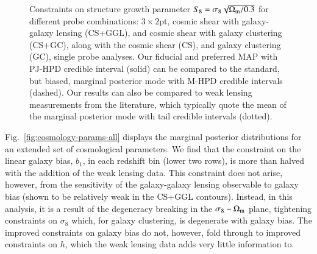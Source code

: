 \begin{figure}
\begin{center}
		\caption{Constraints on structure growth parameter $S_{8} = \sigma_8 \sqrt{\Omega_{\rm m}/0.3}$ for different probe combinations: $3\times2$pt, cosmic shear with galaxy-galaxy lensing (CS+GGL), and cosmic shear with galaxy clustering (CS+GC), along with the cosmic shear (CS), and galaxy clustering (GC), single probe analyses.   Our fiducial and preferred MAP with PJ-HPD credible interval (solid) can be compared to the standard, but biased, marginal posterior mode with M-HPD credible intervals (dashed).    Our results can also be compared to weak lensing measurements from the literature, which typically quote the mean of the marginal posterior mode with tail credible intervals (dotted). 
		\label{fig:S8comp}}
	\end{center}
\end{figure}

Fig.~\ref{fig:cosmology-params-all} displays the marginal posterior distributions for an extended set of cosmological parameters.  
We find that the constraint on the linear galaxy bias,  $b_1$, in each redshift bin (lower two rows), is more than halved with the addition of the weak lensing data. 
This constraint does not arise, however, from the sensitivity of the galaxy-galaxy lensing observable to galaxy bias (shown to be relatively weak in the CS+GGL contours). 
Instead, in this analysis, it is a result of the degeneracy breaking in the $\sigma_8-\Omega_{\rm m}$ plane, tightening constraints on $\sigma_8$ which, for galaxy clustering, is degenerate with galaxy bias. 
The improved constraints on galaxy bias do not, however, fold through to improved constraints on $h$, which the weak lensing data adds very little information to. 

